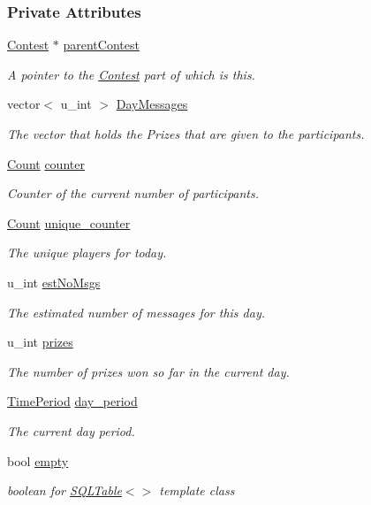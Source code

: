 \subsubsection*{Private Attributes}
\begin{CompactItemize}
\item 
\hyperlink{classContest}{Contest} $\ast$ \hyperlink{classDay_Dayo0}{parent\-Contest}
\begin{CompactList}\small\item\em A pointer to the \hyperlink{classContest}{Contest} part of which is this.\item\end{CompactList}\item 
vector$<$ u\_\-int $>$ \hyperlink{classDay_Dayo1}{Day\-Messages}
\begin{CompactList}\small\item\em The vector that holds the Prizes that are given to the participants.\item\end{CompactList}\item 
\hyperlink{classCount}{Count} \hyperlink{classDay_Dayo2}{counter}
\begin{CompactList}\small\item\em Counter of the current number of participants.\item\end{CompactList}\item 
\hyperlink{classCount}{Count} \hyperlink{classDay_Dayo3}{unique\_\-counter}
\begin{CompactList}\small\item\em The unique players for today.\item\end{CompactList}\item 
u\_\-int \hyperlink{classDay_Dayo4}{est\-No\-Msgs}
\begin{CompactList}\small\item\em The estimated number of messages for this day.\item\end{CompactList}\item 
u\_\-int \hyperlink{classDay_Dayo5}{prizes}
\begin{CompactList}\small\item\em The number of prizes won so far in the current day.\item\end{CompactList}\item 
\hyperlink{classTimePeriod}{Time\-Period} \hyperlink{classDay_Dayo6}{day\_\-period}
\begin{CompactList}\small\item\em The current day period.\item\end{CompactList}\item 
bool \hyperlink{classDay_Dayo7}{empty}
\begin{CompactList}\small\item\em boolean for \hyperlink{classSQLTable}{SQLTable}$<$$>$ template class\item\end{CompactList}\end{CompactItemize}
